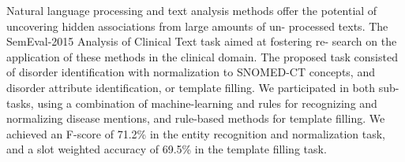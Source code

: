 Natural language processing and text analysis methods offer the potential of uncovering hidden associations from large amounts of un- processed texts. The SemEval-2015 Analysis of Clinical Text task aimed at fostering re- search on the application of these methods in the clinical domain. The proposed task consisted of disorder identification with normalization to SNOMED-CT concepts, and disorder attribute identification, or template filling. We participated in both sub-tasks, using a combination of machine-learning and rules for recognizing and normalizing disease mentions, and rule-based methods for template filling. We achieved an F-score of 71.2\% in the entity recognition and normalization task, and a slot weighted accuracy of 69.5\% in the template filling task.
